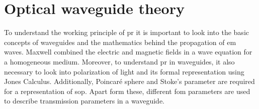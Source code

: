 \documentclass[../report.tex]{subfiles}
\begin{document}
	
	
\chapter{Optical waveguide theory}
To understand the working principle of \gls{pr} it is important to look into the basic concepts of waveguides and the mathematics behind the propagation of \gls{em} waves. Maxwell combined the electric and magnetic fields in a wave equation for a homogeneous medium. Moreover, to understand \gls{pr} in waveguides, it also necessary to look into polarization of light and its formal representation using Jones Calculus. Additionally, Poincaré sphere and Stoke's parameter are required for a representation of \gls{sop}. Apart form these, different \gls{fom} parameters are used to describe transmission parameters in a waveguide.   
		
\end{document}
